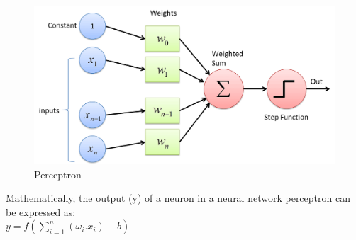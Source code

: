\begin{figure}[H]
    \centering
    \includegraphics[width=0.7\linewidth]{tex/img/Perceptron.png}
    \caption{Perceptron}
    \label{fig:Perceptron}
\end{figure}

Mathematically, the output (y) of a neuron in a neural network perceptron can be expressed as:\\

\(y=f(\sum_{i=1}^{n}(\omega_{i}.x_{i})+b)\)

